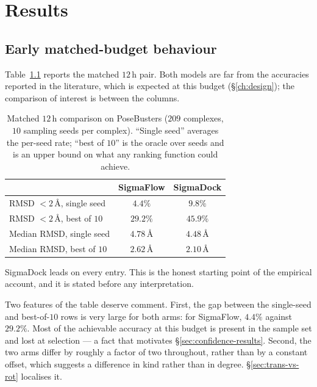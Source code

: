 \chapter{Results}
\label{ch:results}

\section{Early matched-budget behaviour}
\label{sec:early-results}

Table~\ref{tab:12h} reports the matched $12$\,h pair. Both models are far from
the accuracies reported in the literature, which is expected at this budget
(\S\ref{ch:design}); the comparison of interest is between the columns.

\begin{table}[htbp]
\centering
\caption{Matched $12$\,h comparison on PoseBusters ($209$ complexes,
$10$ sampling seeds per complex). ``Single seed'' averages the per-seed rate;
``best of $10$'' is the oracle over seeds and is an upper bound on what any
ranking function could achieve.}
\label{tab:12h}
\small
\begin{tabular}{@{}lcc@{}}
\toprule
 & SigmaFlow & SigmaDock \\
\midrule
RMSD $<2$\,\AA, single seed      & $4.4\%$  & $\mathbf{9.8\%}$ \\
RMSD $<2$\,\AA, best of $10$     & $29.2\%$ & $\mathbf{45.9\%}$ \\
Median RMSD, single seed         & $4.78$\,\AA & $\mathbf{4.48}$\,\AA \\
Median RMSD, best of $10$        & $2.62$\,\AA & $\mathbf{2.10}$\,\AA \\
\bottomrule
\end{tabular}
\end{table}

SigmaDock leads on every entry. This is the honest starting point of the
empirical account, and it is stated before any interpretation.

Two features of the table deserve comment. First, the gap between the
single-seed and best-of-$10$ rows is very large for both arms: for SigmaFlow,
$4.4\%$ against $29.2\%$. Most of the achievable accuracy at this budget is
present in the sample set and lost at selection --- a fact that motivates
\S\ref{sec:confidence-results}. Second, the two arms differ by roughly a
factor of two throughout, rather than by a constant offset, which suggests a
difference in kind rather than in degree. \S\ref{sec:trans-vs-rot} localises
it.

